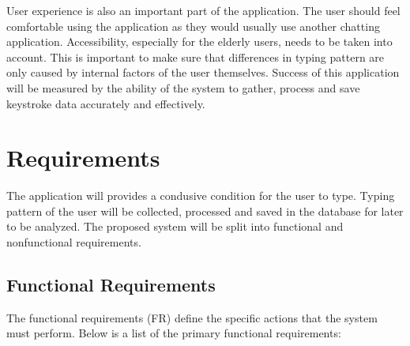 User experience is also an important part of the application.
The user should feel comfortable using the application as they would usually use another chatting application.
Accessibility, especially for the elderly users, needs to be taken into account.
This is important to make sure that differences in typing pattern are only caused by internal factors of the user themselves.
Success of this application will be measured by the ability of the system to gather, process and save keystroke data accurately and effectively.

\section{Requirements}


The application will provides a condusive condition for the user to type.
Typing pattern of the user will be collected, processed and saved in the database for later to be analyzed.
The proposed system will be split into functional and nonfunctional requirements.

\subsection{Functional Requirements}



The functional requirements (FR) define the specific actions that the system must perform. 
Below is a list of the primary functional requirements:

